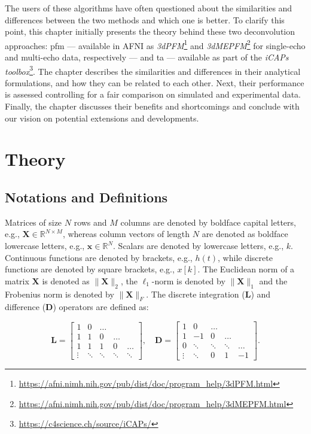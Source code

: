 The users of these algorithms have often questioned about the similarities and
differences between the two methods and which one is better. To clarify this
point, this chapter initially presents the theory behind these two deconvolution
approaches: \acrfull*{pfm} \citep{Gaudes2013Paradigmfreemapping} --- available
in AFNI as
\textit{3dPFM}\footnote{\url{https://afni.nimh.nih.gov/pub/dist/doc/program_help/3dPFM.html}}
and
\textit{3dMEPFM}\footnote{\url{https://afni.nimh.nih.gov/pub/dist/doc/program_help/3dMEPFM.html}}
for single-echo and multi-echo data, respectively --- and \acrfull*{ta}
\citep{Karahanoglu2013TotalactivationfMRI} --- available as part of the
\textit{iCAPs toolbox}\footnote{\url{https://c4science.ch/source/iCAPs/}}. The
chapter describes the similarities and differences in their analytical
formulations, and how they can be related to each other. Next, their performance
is assessed controlling for a fair comparison on simulated and experimental
data. Finally, the chapter discusses their benefits and shortcomings and
conclude with our vision on potential extensions and developments.

\section{Theory}
\label{sec:synthesis_theory}
\subsection{Notations and Definitions}

Matrices of size $N$ rows and $M$ columns are denoted by boldface capital
letters, e.g., $\mathbf{X} \in \mathbb{R}^{N\times M}$, whereas column vectors
of length $N$ are denoted as boldface lowercase letters, e.g., $\mathbf{x} \in
\mathbb{R}^{N}$. Scalars are denoted by lowercase letters, e.g., $k$. Continuous
functions are denoted by brackets, e.g., $h(t)$, while discrete functions are
denoted by square brackets, e.g., $x[k]$. The Euclidean norm of a matrix
$\mathbf{X}$ is denoted as $\|\mathbf{X}\|_2$, the $\ell_1$-norm is denoted by
$\| \mathbf{X} \|_1$ and the Frobenius norm is denoted by $\| \mathbf{X} \|_F$.
The discrete integration ($\mathbf{L}$) and difference ($\mathbf{D}$) operators
are defined as:

$$
\mathbf{L} = \left[\begin{array}{ccccc}
1 & 0 & \ldots & & \\
1 & 1 & 0 & \ldots & \\
1 & 1 & 1 & 0 & \ldots \\
\vdots & \ddots & \ddots & \ddots & \ddots
\end{array}\right], \quad \mathbf{D} = \left[\begin{array}{ccccc}
1 & 0 & \ldots & & \\
1 & -1 & 0 & \ldots & \\
0 & \ddots & \ddots & \ddots & \ldots \\
\vdots & \ddots & 0 & 1 & -1
\end{array}\right].
$$

